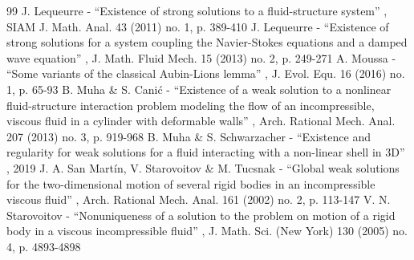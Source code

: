 \documentclass[10pt]{amsart}
\theoremstyle{remark}
\theoremstyle{definition}
\begin{document}
\begin{thebibliography}{99}
 J. Lequeurre - “Existence of strong solutions to a fluid-structure system” , SIAM J. Math. Anal. 43 (2011) no. 1, p. 389-410
 J. Lequeurre - “Existence of strong solutions for a system coupling the Navier-Stokes equations and a damped wave equation” , J. Math. Fluid Mech. 15 (2013) no. 2, p. 249-271
 A. Moussa - “Some variants of the classical Aubin-Lions lemma” , J. Evol. Equ. 16 (2016) no. 1, p. 65-93
 B. Muha \& S. Canić - “Existence of a weak solution to a nonlinear fluid-structure interaction problem modeling the flow of an incompressible, viscous fluid in a cylinder with deformable walls” , Arch. Rational Mech. Anal. 207 (2013) no. 3, p. 919-968
 B. Muha \& S. Schwarzacher - “Existence and regularity for weak solutions for a fluid interacting with a non-linear shell in 3D” , 2019
 J. A. San Martín, V. Starovoitov \& M. Tucsnak - “Global weak solutions for the two-dimensional motion of several rigid bodies in an incompressible viscous fluid” , Arch. Rational Mech. Anal. 161 (2002) no. 2, p. 113-147
 V. N. Starovoitov - “Nonuniqueness of a solution to the problem on motion of a rigid body in a viscous incompressible fluid” , J. Math. Sci. (New York) 130 (2005) no. 4, p. 4893-4898
\end{thebibliography}
\end{document}
